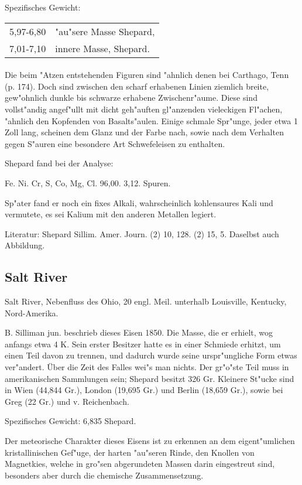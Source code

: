 \documentclass[a4paper, 11pt, oneside]{article}
\begin{document}
Spezifisches Gewicht:  
\begin{table}[!ht]
    \centering
    \begin{tabular}{l l}
        5,97-6,80 & "au"sere Masse Shepard,\\
        7,01-7,10 & innere Masse, Shepard.
    \end{tabular}
\end{table}
\paragraph{}
Die beim "Atzen entstehenden Figuren sind "ahnlich denen bei Carthago, Tenn (p. 174). Doch sind zwischen den scharf erhabenen Linien ziemlich breite, gew"ohnlich dunkle bis schwarze erhabene Zwischenr"aume. Diese sind vollst"andig angef"ullt mit dicht geh"auften gl"anzenden vieleckigen Fl"achen, "ahnlich den Kopfenden von Basalts"aulen. Einige schmale Spr"unge, jeder etwa 1 Zoll lang, scheinen dem Glanz und der Farbe nach, sowie nach dem Verhalten gegen S"auren eine besondere Art Schwefeleisen zu enthalten.

Shepard fand bei der Analyse:

Fe. Ni. Cr, S, Co, Mg, Cl.
96,00. 3,12. Spuren.

Sp"ater fand er noch ein fixes Alkali, wahrscheinlich kohlensaures Kali und vermutete, es sei Kalium mit den anderen Metallen legiert.

Literatur: Shepard Sillim. Amer. Journ. (2) 10, 128. (2) 15, 5. Daselbst auch Abbildung.

\subsection{Salt River}

Salt River, Nebenfluss des Ohio, 20 engl. Meil. unterhalb Louisville, Kentucky, Nord-Amerika.

B. Silliman jun. beschrieb dieses Eisen 1850. Die Masse, die er erhielt, wog anfangs etwa 4 K. Sein erster Besitzer hatte es in einer Schmiede erhitzt, um einen Teil davon zu trennen, und dadurch wurde seine urspr"ungliche Form etwas ver"andert. Über die Zeit des Falles wei"s man nichts. Der gr"o"ste Teil muss in amerikanischen Sammlungen sein; Shepard besitzt 326 Gr. Kleinere St"ucke sind in Wien (44,844 Gr.), London (19,695 Gr.) und Berlin (18,659 Gr.), sowie bei Greg (22 Gr.) und v. Reichenbach.

Spezifisches Gewicht: 6,835 Shepard.

Der meteorische Charakter dieses Eisens ist zu erkennen an dem eigent"umlichen kristallinischen Gef"uge, der harten "au"seren Rinde, den Knollen von Magnetkies, welche in gro"sen abgerundeten Massen darin eingestreut sind, besonders aber durch die chemische Zusammensetzung.
\end{document}
